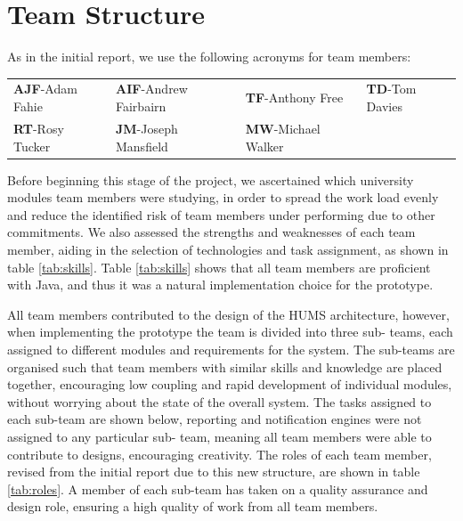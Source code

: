 \section{Team Structure}
\label{sec:team}

As in the initial report, we use the following acronyms for team members:

\begin{tabular}{ p{3cm} p{4cm} p{3.5cm} p{3.5cm} }
  \textbf{AJF}-Adam Fahie &
  \textbf{AIF}-Andrew Fairbairn &
  \textbf{TF}-Anthony Free &
  \textbf{TD}-Tom Davies \\
    \textbf{RT}-Rosy Tucker &
  \textbf{JM}-Joseph Mansfield &
  \textbf{MW}-Michael Walker \\
\end{tabular}

Before beginning this stage of the project, we ascertained which university 
modules team members were studying, in order to spread the work load evenly 
and reduce the identified risk of team members under performing due to 
other commitments. We also assessed the strengths and weaknesses of each 
team member, aiding in the selection of technologies and task assignment, as 
shown in table \ref{tab:skills}. Table \ref{tab:skills} shows that all team members 
are proficient with Java, and thus it was a natural implementation choice for the 
prototype.

All team members contributed to the design of the HUMS architecture, 
however, when implementing the prototype the team is divided into three sub-
teams, each assigned to different modules and requirements for the system.
The sub-teams are organised such that team members with similar skills and 
knowledge are placed together, encouraging low coupling and rapid 
development of individual modules, without worrying about the state of the 
overall system. The tasks assigned to each sub-team are shown below, 
reporting and notification engines were not assigned to any particular sub-
team, meaning all team members were able to contribute to designs, 
encouraging creativity. The roles of each team member, revised from the initial 
report due to this new structure, are shown in table \ref{tab:roles}. A member of 
each sub-team has taken on a quality assurance and design role, ensuring a 
high quality of work from all team members.

